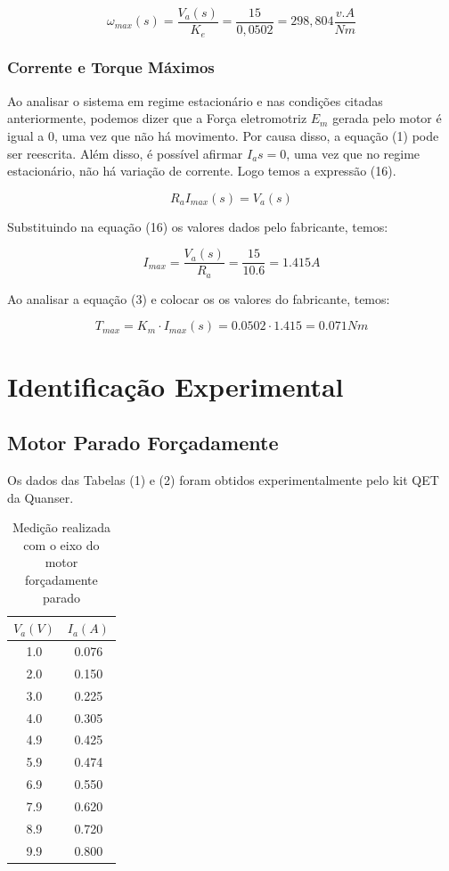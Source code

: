 \documentclass[12pt]{article}
\begin{document}
\begin{equation}
    \omega_{max} (s) = \frac{V_a(s)}{K_e} = \frac{15}{0,0502} = 298,804 \frac{v.A}{Nm}
\end{equation}

\subsubsection{Corrente e Torque Máximos}

\quad Ao analisar o sistema em regime estacionário e nas condições citadas anteriormente, podemos dizer que a Força eletromotriz $E_m$ gerada pelo motor é igual a 0, uma vez que não há movimento. Por causa disso, a equação (1) pode ser reescrita. Além disso, é possível afirmar $I_as = 0$, uma vez que no regime estacionário, não há variação de corrente. Logo temos a expressão (16). 

\begin{equation}
    R_a I_{max}(s) = V_a(s)
\end{equation}

\quad Substituindo na equação (16) os valores dados pelo fabricante, temos:

\begin{equation}
    I_{max} = \frac{V_a(s)}{R_a} = \frac{15}{10.6} = 1.415 A
\end{equation}

\quad Ao analisar a equação (3) e colocar os os valores do fabricante, temos:

\begin{equation}
    T_{max} = K_m \cdot I_{max}(s) = 0.0502 \cdot 1.415 = 0.071 Nm
\end{equation}

\section{Identificação Experimental}

\subsection{Motor Parado Forçadamente}

\quad Os dados das Tabelas (1) e (2) foram obtidos experimentalmente pelo kit QET da Quanser. 

\begin{table}[H]
\centering
\begin{tabular}{c c} 
 \hline
 $V_a(V)$ & $I_a(A)$ \\ 
 \hline
 1.0 & 0.076 \\ 
 2.0 & 0.150 \\
 3.0 & 0.225 \\
 4.0 & 0.305\\
 4.9 & 0.425\\
 5.9 & 0.474\\
 6.9 & 0.550\\
 7.9 & 0.620\\
 8.9 & 0.720\\
 9.9 & 0.800\\
 \hline
\end{tabular}
\caption{Medição realizada com o eixo do motor forçadamente parado}
\label{table:data1}
\end{table}
\end{document}
